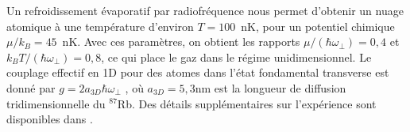 
Un refroidissement évaporatif par radiofréquence nous permet d’obtenir un nuage atomique à une température d’environ $T = 100$~nK, pour un potentiel chimique $\mu / k_B = 45$~nK. Avec ces paramètres, on obtient les rapports $\mu / (\hbar \omega_{\perp}) = 0{,}4$ et $k_B T / (\hbar \omega_{\perp}) = 0{,}8$, ce qui place le gaz dans le régime unidimensionnel. Le couplage effectif en 1D pour des atomes dans l’état fondamental transverse est donné par $g = 2 a_{3D} \hbar \omega_{\perp}$ \cite{PhysRevLett.81.938}, où $a_{3D} = 5{,}3$nm est la longueur de diffusion tridimensionnelle du $^{87}$Rb\cite{PhysRevLett.89.283202}. Des détails supplémentaires sur l’expérience sont disponibles dans \cite{duboistel-04749900}.




